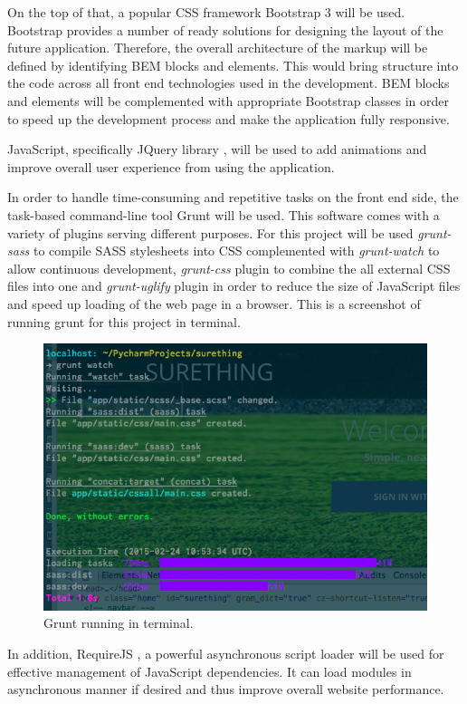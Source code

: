 On the top of that, a popular CSS framework Bootstrap 3 \cite{documentation:Bootstrap3} will be used. Bootstrap provides a number of ready solutions for designing the layout of the future application. Therefore, the overall architecture of the markup will be defined by identifying BEM blocks and elements. This would bring structure into the code across all front end technologies used in the development. BEM blocks and elements will be complemented with appropriate Bootstrap classes in order to speed up the development process and make the application fully responsive.
 
JavaScript, specifically JQuery library \cite{documentation:jQuery}, will be used to add animations and improve overall user experience from using the application.  

In order to handle time-consuming and repetitive tasks on the front end side, the task-based command-line tool Grunt will be used. This software comes with a variety of plugins serving different purposes. For this project will be used \emph{grunt-sass} to compile SASS stylesheets into CSS complemented with \emph{grunt-watch} to allow continuous development, \emph{grunt-css} plugin to combine the all external CSS files into one and \emph{grunt-uglify} plugin in order to reduce the size of JavaScript files and speed up loading of the web page in a browser. This is a screenshot of running grunt for this project in terminal.

\begin{figure}[H]
	\begin{center}
		\includegraphics[width=.60\linewidth,natwidth=610,natheight=540]{impl/images/gruntInAction}
		\caption{Grunt running in terminal.} \label{fig:using:gruntInAction}
	\end{center}
\end{figure}
	
In addition, RequireJS  \cite{documentation:RequireJS}, a powerful asynchronous script loader will be used for effective management of JavaScript dependencies. It can load modules in asynchronous manner if desired and thus improve overall website performance.

